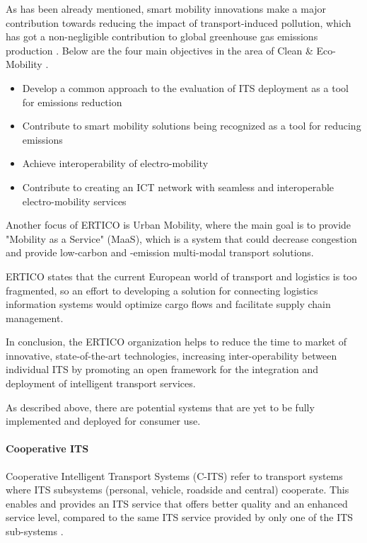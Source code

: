 \documentclass[0main.tex]{subfiles}
\begin{document}
As has been already mentioned, smart mobility innovations make a major contribution towards 
reducing the impact of transport-induced pollution, which has got a non-negligible contribution to 
global greenhouse gas emissions production \cite{Ritchie2020}. Below are the four main
objectives in the area of Clean \& Eco-Mobility \cite{ertico}.

\begin{itemize}
    \setlength\itemsep{-10pt}
    \item Develop a common approach to the evaluation of ITS deployment as a tool for emissions reduction
    \item Contribute to smart mobility solutions being recognized as a tool for reducing emissions
    \item Achieve interoperability of electro-mobility
    \item Contribute to creating an ICT network with seamless and interoperable electro-mobility services
\end{itemize}

Another focus of ERTICO is Urban Mobility, where the main goal is to provide "Mobility as a Service" (MaaS), 
which is a system that could decrease congestion and provide low-carbon and -emission multi-modal transport 
solutions.  

ERTICO states that the current European world of transport and logistics is too fragmented, so an effort to 
developing a solution for connecting logistics information systems would optimize cargo flows and facilitate supply 
chain management. 

In conclusion, the ERTICO organization helps to reduce the time to market of innovative,
state-of-the-art technologies, increasing inter-operability between individual ITS by promoting
an open framework for the integration and deployment of intelligent transport services. 

As described above, there are potential systems that are yet to be fully implemented and
deployed for consumer use. 

\paragraph{Cooperative ITS}

Cooperative Intelligent Transport Systems (C-ITS) refer to transport systems where ITS 
subsystems (personal, vehicle, roadside and central) cooperate. This
enables and provides an ITS service that offers better quality and an enhanced service level,
compared to the same ITS service provided by only one of the ITS sub-systems \cite{2022}.
\end{document}
